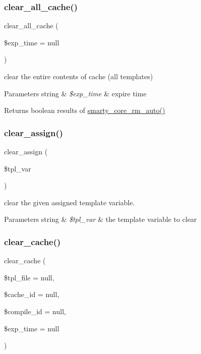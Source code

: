 \subsubsection{\texorpdfstring{clear\+\_\+all\+\_\+cache()}{clear\_all\_cache()}}
{\footnotesize\ttfamily clear\+\_\+all\+\_\+cache (\begin{DoxyParamCaption}\item[{}]{\$exp\+\_\+time = {\ttfamily null} }\end{DoxyParamCaption})}

clear the entire contents of cache (all templates)


\begin{DoxyParams}[1]{Parameters}
string & {\em \$exp\+\_\+time} & expire time \\
\hline
\end{DoxyParams}
\begin{DoxyReturn}{Returns}
boolean results of \mbox{\hyperlink{}{smarty\+\_\+core\+\_\+rm\+\_\+auto()}} 
\end{DoxyReturn}
\mbox{\label{class_smarty_ad0188dcb261ac235ac70c141f2e6657e}} 
\subsubsection{\texorpdfstring{clear\+\_\+assign()}{clear\_assign()}}
{\footnotesize\ttfamily clear\+\_\+assign (\begin{DoxyParamCaption}\item[{}]{\$tpl\+\_\+var }\end{DoxyParamCaption})}

clear the given assigned template variable.


\begin{DoxyParams}[1]{Parameters}
string & {\em \$tpl\+\_\+var} & the template variable to clear \\
\hline
\end{DoxyParams}
\mbox{\label{class_smarty_a6b5412f074996dea92d89b32a13880d8}} 
\subsubsection{\texorpdfstring{clear\+\_\+cache()}{clear\_cache()}}
{\footnotesize\ttfamily clear\+\_\+cache (\begin{DoxyParamCaption}\item[{}]{\$tpl\+\_\+file = {\ttfamily null},  }\item[{}]{\$cache\+\_\+id = {\ttfamily null},  }\item[{}]{\$compile\+\_\+id = {\ttfamily null},  }\item[{}]{\$exp\+\_\+time = {\ttfamily null} }\end{DoxyParamCaption})}

